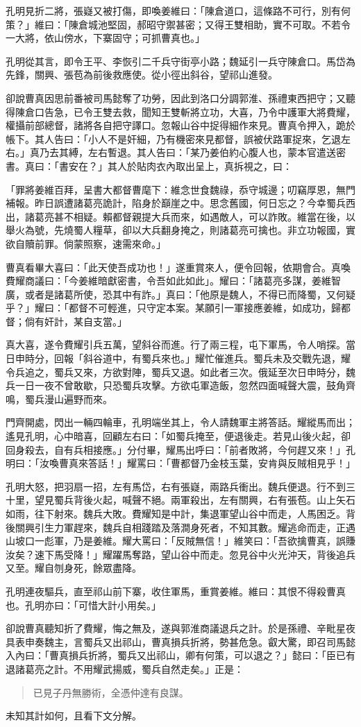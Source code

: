孔明見折二將，張嶷又被打傷，即喚姜維曰：「陳倉道口，這條路不可行，別有何策？」維曰：「陳倉城池堅固，郝昭守禦甚密；又得王雙相助，實不可取。不若令一大將，依山傍水，下寨固守；可抓曹真也。」

孔明從其言，即令王平、李恢引二千兵守街亭小路；魏延引一兵守陳倉口。馬岱為先鋒，關興、張苞為前後救應使。從小徑出斜谷，望祁山進發。

卻說曹真因思前番被司馬懿奪了功勞，因此到洛口分調郭淮、孫禮東西把守；又聽得陳倉口告急，已令王雙去救，聞知王雙斬將立功，大喜，乃令中護軍大將費耀，權攝前部總督，諸將各自把守譯口。忽報山谷中捉得細作來見。曹真令押入，跪於帳下。其人告曰：「小人不是奸細，乃有機密來見都督，誤被伏路軍捉來，乞退左右。」真乃去其縛，左右暫退。其人告曰：「某乃姜伯約心腹人也，蒙本官遣送密書。真曰：「書安在？」其人於貼肉衣內取出呈上，真拆視之，曰：

「罪將姜維百拜，呈書大都督曹麾下：維念世食魏祿，忝守城邊；叨竊厚恩，無門補報。昨日誤遭諸葛亮詭計，陷身於巔崖之中。思念舊國，何日忘之？今幸蜀兵西出，諸葛亮甚不相疑。賴都督親提大兵而來，如遇敵人，可以詐敗。維當在後，以舉火為號，先燒蜀人糧草，卻以大兵翻身掩之，則諸葛亮可擒也。非立功報國，實欲自贖前罪。倘蒙照察，速需來命。」

曹真看畢大喜曰：「此天使吾成功也！」遂重賞來人，便令回報，依期會合。真喚費耀商議曰：「今姜維暗獻密書，令吾如此如此」。耀曰：「諸葛亮多謀，姜維智廣，或者是諸葛所使，恐其中有詐。」真曰：「他原是魏人，不得已而降蜀，又何疑乎？」耀曰：「都督不可輕進，只守定本案。某願引一軍接應姜維，如成功，歸都督；倘有奸計，某自支當。」

真大喜，遂令費耀引兵五萬，望斜谷而進。行了兩三程，屯下軍馬，令人哨探。當日申時分，回報「斜谷道中，有蜀兵來也。」耀忙催進兵。蜀兵未及交戰先退，耀令兵追之，蜀兵又來，方欲對陣，蜀兵又退。如此者三次。俄延至次日申時分，魏兵一日一夜不曾敢歇，只恐蜀兵攻擊。方欲屯軍造飯，忽然四面喊聲大震，鼓角齊鳴，蜀兵漫山遍野而來。

門齊開處，閃出一輛四輪車，孔明端坐其上，令人請魏軍主將答話。耀縱馬而出；遙見孔明，心中暗喜，回顧左右曰：「如蜀兵掩至，便退後走。若見山後火起，卻回身殺去，自有兵相接應。」分付畢，耀馬出呼曰：「前者敗將，今何趕又來！」孔明曰：「汝喚曹真來答話！」耀罵曰：「曹都督乃金枝玉葉，安肯與反賊相見乎！」

孔明大怒，把羽扇一招，左有馬岱，右有張嶷，兩路兵衝出。魏兵便退。行不到三十里，望見蜀兵背後火起，喊聲不絕。兩軍殺出，左有關興，右有張苞。山上矢石如雨，往下射來。魏兵大敗。費耀知是中計，集退軍望山谷中而走，人馬困乏。背後關興引生力軍趕來，魏兵自相踐踏及落澗身死者，不知其數。耀逃命而走，正遇山坡口一彪軍，乃是姜維。耀大罵曰：「反賊無信！」維笑曰：「吾欲擒曹真，誤賺汝矣？速下馬受降！」耀躍馬奪路，望山谷中而走。忽見谷中火光沖天，背後追兵又至。耀自刎身死，餘眾盡降。

孔明連夜驅兵，直至祁山前下寨，收住軍馬，重賞姜維。維曰：其恨不得殺曹真也。孔明亦曰：「可惜大計小用矣。」

卻說曹真聽知折了費耀，悔之無及，遂與郭淮商議退兵之計。於是孫禮、辛毗星夜具表申奏魏主，言蜀兵又出祁山，曹真損兵折將，勢甚危急。叡大驚，即召司馬懿入內曰：「曹真損兵折將，蜀兵又出祁山，卿有何策，可以退之？」懿曰：「臣已有退諸葛亮之計。不用耀武揚威，蜀兵自然走矣。」正是：

\begin{quote}
已見子丹無勝術，全憑仲達有良謀。
\end{quote}

未知其計如何，且看下文分解。
